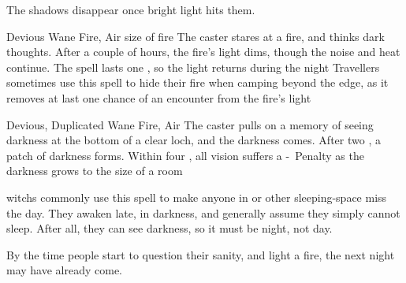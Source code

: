 \begin{multicols}{2}
{  The shadows disappear once bright light hits them.}

\setcounter{diceNo}{1}


  {Devious}%
  {Wane}%
  {Fire, Air}%
  {size of fire}%
  {The caster stares at a fire, and thinks dark thoughts.
  After a couple of hours, the fire's light dims, though the noise and heat continue.
  The spell lasts one \showOnset, so the light returns during the night}%
  {Travellers sometimes use this spell to hide their fire when camping beyond the \gls{edge}, as it removes at last one chance of an encounter from the fire's light}



  {Devious, Duplicated}%
  {Wane}%
  {Fire, Air}%
  {}%
  {The caster pulls on a memory of seeing darkness at the bottom of a clear loch, and the darkness comes.
  After two , a patch of darkness forms.
  Within four , all vision suffers a -~Penalty as the darkness grows to the size of a room}%
  {
  \Glspl{witch} commonly use this spell to make anyone in  or other sleeping-space miss the day.
  They awaken late, in darkness, and generally assume they simply cannot sleep.
  After all, they can see darkness, so it must be night, not day.

  By the time people start to question their sanity, and light a fire, the next night may have already come.
  }


\iftoggle{intro}{}{

  \subsection[Force]{\glsfmttext{Force}~Force}
  \label{forceSpells}

  \showSpells{Force1}

  \showSpells{Force1}

  \spell{Close the Gate}%
    {}%
    {Wane}%
    {Earth, Fire}%
    {8 + Gateway's level}%
    {The caster shouts `close the gate', at a magical gateway, and the \gls{spell} collapses}%
    {Anyone inside the gateway is spat out like a rotten lump of soup.}

}
\end{multicols}
